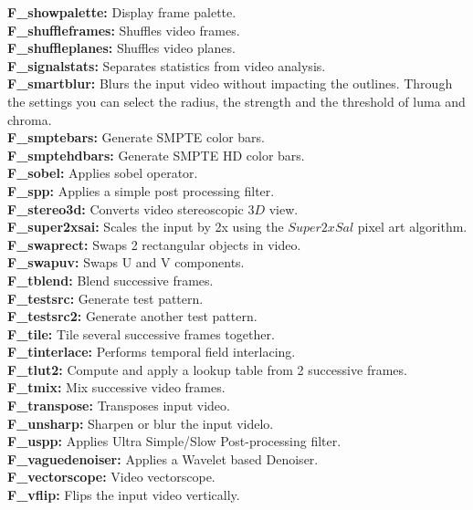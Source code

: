\textbf{F\_showpalette:} Display frame palette.\\
\textbf{F\_shuffleframes:} Shuffles video frames.\\
\textbf{F\_shuffleplanes:} Shuffles video planes.\\
\textbf{F\_signalstats:} Separates statistics from video analysis.\\
\textbf{F\_smartblur:} Blurs the input video without impacting the outlines. Through the settings you can select the radius, the strength and the threshold of luma and chroma.\\
\textbf{F\_smptebars:} Generate SMPTE color bars.\\
\textbf{F\_smptehdbars:} Generate SMPTE HD color bars.\\
\textbf{F\_sobel:} Applies sobel operator.\\
\textbf{F\_spp:} Applies a simple post processing filter.\\
\textbf{F\_stereo3d:} Converts video stereoscopic $3D$ view.\\
\textbf{F\_super2xsai:} Scales the input by 2x using the $Super2xSal$ pixel art algorithm.\\
\textbf{F\_swaprect:} Swaps 2 rectangular objects in video.\\
\textbf{F\_swapuv:} Swaps U and V components.\\
\textbf{F\_tblend:} Blend successive frames.\\
\textbf{F\_testsrc:} Generate test pattern.\\
\textbf{F\_testsrc2:} Generate another test pattern.\\
\textbf{F\_tile:} Tile several successive frames together.\\
\textbf{F\_tinterlace:} Performs temporal field interlacing.\\
\textbf{F\_tlut2:} Compute and apply a lookup table from 2 successive frames.\\
\textbf{F\_tmix:} Mix successive video frames.\\
\textbf{F\_transpose:} Transposes input video.\\
\textbf{F\_unsharp:} Sharpen or blur the input videlo.\\
\textbf{F\_uspp:} Applies Ultra Simple/Slow Post-processing filter.\\
\textbf{F\_vaguedenoiser:} Applies a Wavelet based Denoiser.\\
\textbf{F\_vectorscope:} Video vectorscope.\\
\textbf{F\_vflip:} Flips the input video vertically.\\
